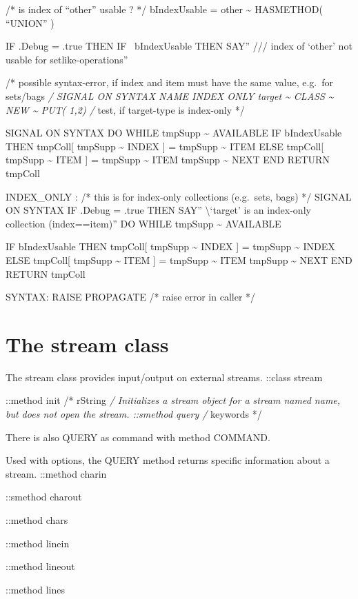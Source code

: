 /* is index of ``other'' usable ? */ bIndexUsable = other
\textasciitilde{} HASMETHOD( ``UNION'' )

IF .Debug = .true THEN IF ~bIndexUsable THEN SAY'' /// index of `other'
not usable for setlike-operations''

/* possible syntax-error, if index and item must have the same value,
e.g.~for sets/bags \emph{/ SIGNAL ON SYNTAX NAME INDEX ONLY target
\textasciitilde{} CLASS \textasciitilde{} NEW \textasciitilde{} PUT(
1,2) /} test, if target-type is index-only */

SIGNAL ON SYNTAX DO WHILE tmpSupp \textasciitilde{} AVAILABLE IF
bIndexUsable THEN tmpColl{[} tmpSupp \textasciitilde{} INDEX {]} =
tmpSupp \textasciitilde{} ITEM ELSE tmpColl{[} tmpSupp \textasciitilde{}
ITEM {]} = tmpSupp \textasciitilde{} ITEM tmpSupp \textasciitilde{} NEXT
END RETURN tmpColl

INDEX\_ONLY : /* this is for index-only collections (e.g.~sets, bags) */
SIGNAL ON SYNTAX IF .Debug = .true THEN SAY'' \textbackslash{}`target'
is an index-only collection (index==item)'' DO WHILE tmpSupp
\textasciitilde{} AVAILABLE

IF bIndexUsable THEN tmpColl{[} tmpSupp \textasciitilde{} INDEX {]} =
tmpSupp \textasciitilde{} INDEX ELSE tmpColl{[} tmpSupp
\textasciitilde{} ITEM {]} = tmpSupp \textasciitilde{} ITEM tmpSupp
\textasciitilde{} NEXT END RETURN tmpColl

SYNTAX: RAISE PROPAGATE /* raise error in caller */

\section{The stream class}\label{the-stream-class}

The stream class provides input/output on external streams. ::class
stream

::method init /* rString \emph{/ Initializes a stream object for a
stream named name, but does not open the stream. ::smethod query /}
keywords */

There is also QUERY as command with method COMMAND.

Used with options, the QUERY method returns specific information about a
stream. ::method charin

::smethod charout

::method chars

::method linein

::method lineout

::method lines

